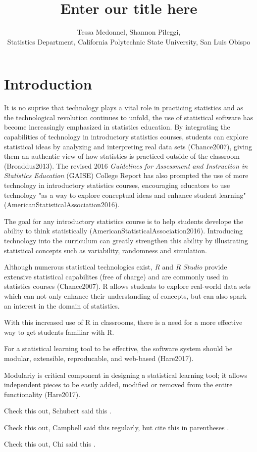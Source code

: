 \documentclass{tise_style}
\title{Enter our title here}
\author{Tessa Mcdonnel, Shannon Pileggi,  \\Statistics Department, California Polytechnic State University, San Luis Obispo}
\begin{document}
\section{Introduction}

It is no suprise that technology plays a vital role in practicing statistics and as the technological revolution continues to 
unfold, the use of statistical software has become increasingly emphasized in statistics education. By integrating the 
capabilities of technology in introductory statistics courses, students can explore statistical ideas by analyzing and 
interpreting real data sets (Chance2007), giving them an authentic view of how statistics is practiced outside of the 
classroom (Broaddus2013). The revised 2016 \textit{Guidelines for Assessment and Instruction in Statistics Education} (GAISE) 
College Report has also prompted the use of more technology in introductory statistics courses, encouraging educators to use technology "as a way to explore conceptual ideas and enhance student learning" (AmericanStatisticalAssociation2016).



The goal for any introductory statistics course is to help students develope the ability to think statistically (AmericanStatisticalAssociation2016). 
Introducing technology into the curriculum can greatly strengthen this ability by illustrating statistical concepts such as variability, randomness and simulation.

Although numerous statistical technologies exist, \textit{R} and \textit{R Studio} provide extensive statistical capabilites (free of charge) and are commonly used in statistics courses (Chance2007). R allows students to explore real-world data sets which can not only enhance their understanding of concepts, but can also spark an interest in the domain of statistics.


With this increased use of R in classrooms, there is a need for a more effective way to get students familiar with R.




For a statistical learning tool to be effective, the software system should be modular, extensible, reproducable, and web-based (Hare2017). 

Modulariy is critical component in designing a statistical learning tool; it allows independent pieces to be easily added, modified or removed from the entire functionality (Hare2017). 


Check this out, Schubert said this \cite{Schubert13}.


Check this out, Campbell said this \cite{Campbell02} regularly, but cite this in parentheses \citep{Campbell02}.


Check this out, Chi said this \cite{Chi81}.




\end{document}
